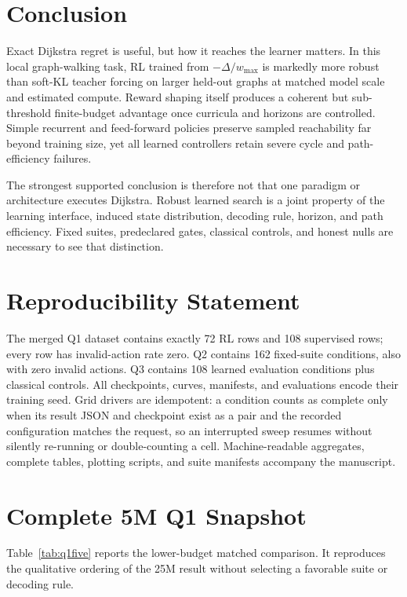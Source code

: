 \documentclass[10pt,twocolumn]{article}
\newcommand{\dlt}{\Delta}
\newcommand{\wmax}{w_{\max}}
\begin{document}
\section{Conclusion}

Exact Dijkstra regret is useful, but how it reaches the learner matters.  In
this local graph-walking task, RL trained from $-\dlt/\wmax$ is markedly more
robust than soft-KL teacher forcing on larger held-out graphs at matched model
scale and estimated compute.  Reward shaping itself produces a coherent but
sub-threshold finite-budget advantage once curricula and horizons are
controlled.  Simple recurrent and feed-forward policies preserve sampled
reachability far beyond training size, yet all learned controllers retain
severe cycle and path-efficiency failures.

The strongest supported conclusion is therefore not that one paradigm or
architecture executes Dijkstra.  Robust learned search is a joint property of
the learning interface, induced state distribution, decoding rule, horizon,
and path efficiency.  Fixed suites, predeclared gates, classical controls, and
honest nulls are necessary to see that distinction.

\section*{Reproducibility Statement}

The merged Q1 dataset contains exactly 72 RL rows and 108 supervised rows;
every row has invalid-action rate zero.  Q2 contains 162 fixed-suite
conditions, also with zero invalid actions.  Q3 contains 108 learned evaluation
conditions plus classical controls.  All checkpoints, curves, manifests, and
evaluations encode their training seed.  Grid drivers are idempotent: a
condition counts as complete only when its result JSON and checkpoint exist as
a pair and the recorded configuration matches the request, so an interrupted
sweep resumes without silently re-running or double-counting a cell.
Machine-readable aggregates, complete tables, plotting scripts, and suite
manifests accompany the manuscript.

\appendix
\section{Complete 5M Q1 Snapshot}

Table~\ref{tab:q1five} reports the lower-budget matched comparison.  It
reproduces the qualitative ordering of the 25M result without selecting a
favorable suite or decoding rule.
\end{document}
